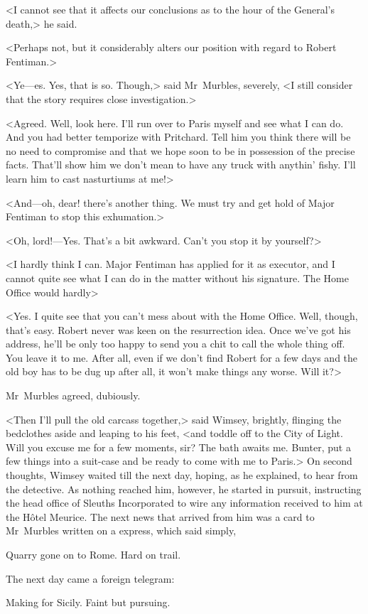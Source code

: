 <I cannot see that it affects our conclusions as to the hour of the General's death,> he said.

<Perhaps not, but it considerably alters our position with regard to Robert Fentiman.>

<Ye—es. Yes, that is so. Though,> said Mr~Murbles, severely, <I still consider that the story requires close investigation.>

<Agreed. Well, look here. I'll run over to Paris myself and see what I can do. And you had better temporize with Pritchard. Tell him you think there will be no need to compromise and that we hope soon to be in possession of the precise facts. That'll show him we don't mean to have any truck with anythin' fishy. I'll learn him to cast nasturtiums at me!>

<And—oh, dear! there's another thing. We must try and get hold of Major Fentiman to stop this exhumation.>

<Oh, lord!—Yes. That's a bit awkward. Can't you stop it by yourself?>

<I hardly think I can. Major Fentiman has applied for it as executor, and I cannot quite see what I can do in the matter without his signature. The Home Office would hardly\longdash>

<Yes. I quite see that you can't mess about with the Home Office. Well, though, that's easy. Robert never was keen on the resurrection idea. Once we've got his address, he'll be only too happy to send you a chit to call the whole thing off. You leave it to me. After all, even if we don't find Robert for a few days and the old boy has to be dug up after all, it won't make things any worse. Will it?>

Mr~Murbles agreed, dubiously.

<Then I'll pull the old carcass together,> said Wimsey, brightly, flinging the bedclothes aside and leaping to his feet, <and toddle off to the City of Light. Will you excuse me for a few moments, sir? The bath awaits me. Bunter, put a few things into a suit-case and be ready to come with me to Paris.>
On second thoughts, Wimsey waited till the next day, hoping, as he explained, to hear from the detective. As nothing reached him, however, he started in pursuit, instructing the head office of Sleuths Incorporated to wire any information received to him at the Hôtel Meurice. The next news that arrived from him was a card to Mr~Murbles written on a  express, which said simply, 
\begin{telegram}[\acronym{PW}]
Quarry gone on to Rome. Hard on trail.
\end{telegram} The next day came a foreign telegram: 
\begin{telegram}[\acronym{PW}]
Making for Sicily. Faint but pursuing.
\end{telegram}



